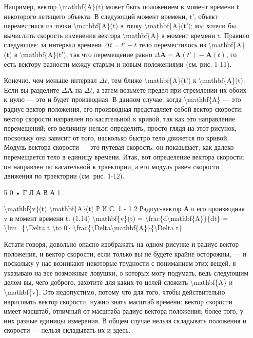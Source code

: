 \documentclass[10pt,oneside]{article}
\begin{document}
Например, вектор \textbackslash{}mathbf\{A\}(t) может быть положением в момент времени t некоторого летящего объекта. В следующий момент времени, t', объект переместился из точки \textbackslash{}mathbf\{A\}(t) в точку \textbackslash{}mathbf\{A\}(t'); мы хотели бы вычислить скорость изменения вектора \textbackslash{}mathbf\{A\} в момент времени t. Правило следующее: за интервал времени \(\Delta t = t' - t\) тело переместилось из \textbackslash{}mathbf\{A\}(t) в \textbackslash{}mathbf\{A\}(t'), так что перемещение равно \(\Delta\mathbf{A} = \mathbf{A}(t') - \mathbf{A}(t)\), то есть вектору разности между старым и новым положениями (см. рис. 1-11).\par

Конечно, чем меньше интервал \(\Delta t\), тем ближе \textbackslash{}mathbf\{A\}(t') к \textbackslash{}mathbf\{A\}(t). Если вы разделите \(\Delta\mathbf{A}\) на \(\Delta t\), а затем возьмете предел при стремлении их обоих к нулю --- это и будет производная. В данном случае, когда \textbackslash{}mathbf\{A\} --- это радиус-вектор положения, его производная представляет собой вектор скорости; вектор скорости направлен по касательной к кривой, так как это направление перемещений; его величину нельзя определить, просто глядя на этот рисунок, поскольку она зависит от того, насколько быстро тело движется по кривой. Модуль вектора скорости --- это путевая скорость; он показывает, как далеко перемещается тело в единицу времени. Итак, вот определение вектора скорости: он направлен по касательной к траектории, а его модуль равен скорости движения по траектории (см. рис. 1-12).\par

5 0 • Г Л А В А   1\par

\textbackslash{}mathbf\{v\}(t) \textbackslash{}mathbf\{A\}(t) Р И С. 1 - 1 2 Радиус-вектор А и его производная v в момент времени t. (1.14) \textbackslash{}mathbf\{v\}(t) = \textbackslash{}frac\{d\textbackslash{}mathbf\{A\}\}\{dt\} = \textbackslash{}lim\_\{\textbackslash{}Delta t \textbackslash{}to 0\} \textbackslash{}frac\{\textbackslash{}Delta\textbackslash{}mathbf\{A\}\}\{\textbackslash{}Delta t\}\par

Кстати говоря, довольно опасно изображать на одном рисунке и радиус-вектор положения, и вектор скорости, если только вы не будете крайне осторожны, --- и поскольку у нас возникают некоторые трудности с пониманием этих вещей, я указываю на все возможные ловушки, о которых могу подумать, ведь следующим делом вы, чего доброго, захотите для каких-то целей сложить \textbackslash{}mathbf\{A\} и \textbackslash{}mathbf\{v\}. Это недопустимо, потому что для того, чтобы действительно нарисовать вектор скорости, нужно знать масштаб времени: вектор скорости имеет масштаб, отличный от масштаба радиус-вектора положения; более того, у них разные единицы измерения. В общем случае нельзя складывать положения и скорости --- нельзя складывать их и здесь.\par
\end{document}
